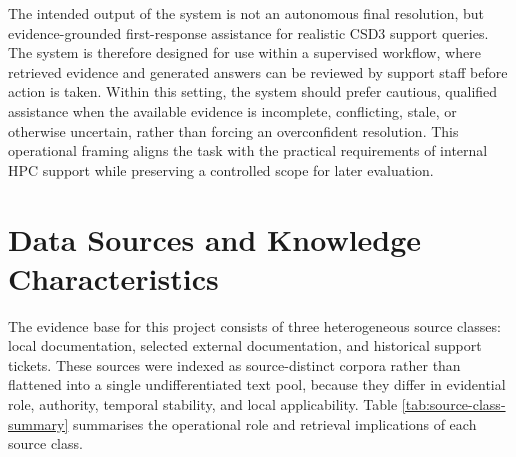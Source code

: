 The intended output of the system is not an autonomous final resolution, but evidence-grounded first-response assistance for realistic \ac{CSD3} support queries. The system is therefore designed for use within a supervised workflow, where retrieved evidence and generated answers can be reviewed by support staff before action is taken. Within this setting, the system should prefer cautious, qualified assistance when the available evidence is incomplete, conflicting, stale, or otherwise uncertain, rather than forcing an overconfident resolution. This operational framing aligns the task with the practical requirements of internal \ac{HPC} support while preserving a controlled scope for later evaluation. 

\section{Data Sources and Knowledge Characteristics}
\label{sec:data}

The evidence base for this project consists of three heterogeneous source classes: local documentation, selected external documentation, and historical support tickets. These sources were indexed as source-distinct corpora rather than flattened into a single undifferentiated text pool, because they differ in evidential role, authority, temporal stability, and local applicability. Table \ref{tab:source-class-summary} summarises the operational role and retrieval implications of each source class.

